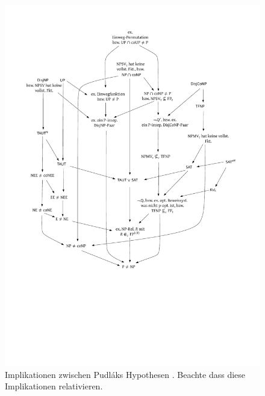\begin{figure}[tb]
    \centering\includegraphics[page=8]{figures.pdf}
    \caption{Implikationen zwischen Pudláks Hypothesen \parencite*{pudlak_incompleteness_2017}. Beachte dass diese Implikationen relativieren.}\label{fig:pudlak-small}
\end{figure}

